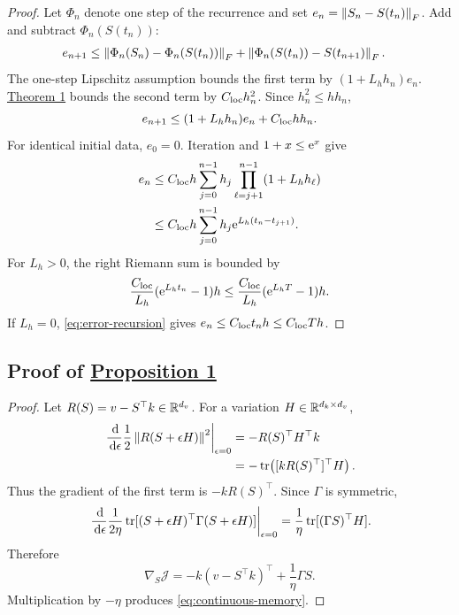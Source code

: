 \begin{proof}
Let $\Phi_n$ denote one step of the recurrence and set
$e_n=\left\lVert S_n-S(t_n)\right\rVert_F$. Add and subtract
$\Phi_n(S(t_n))$:
\begin{align}
 e_{n+1}
 &\le
 \left\lVert \Phi_n(S_n)-\Phi_n(S(t_n))\right\rVert_F
 +\left\lVert \Phi_n(S(t_n))-S(t_{n+1})\right\rVert_F.
 \label{eq:error-recursion-start}
\end{align}
The one-step Lipschitz assumption bounds the first term by
$(1+L_hh_n)e_n$.
\hyperref[thm:local-consistency]{Theorem 1} bounds the second term by
$C_{\rm loc}h_n^2$. Since $h_n^2\le hh_n$,
\begin{equation}
 e_{n+1}\le(1+L_hh_n)e_n+C_{\rm loc}hh_n.
 \label{eq:error-recursion}
\end{equation}
For identical initial data, $e_0=0$. Iteration and
$1+x\le\mathrm{e}^x$ give
\begin{align}
 e_n
 &\le C_{\rm loc}h
 \sum_{j=0}^{n-1}h_j
 \prod_{\ell=j+1}^{n-1}(1+L_hh_\ell) \notag\\
 &\le C_{\rm loc}h
 \sum_{j=0}^{n-1}h_j
 \mathrm{e}^{L_h(t_n-t_{j+1})}.
 \label{eq:discrete-gronwall-sum}
\end{align}
For $L_h>0$, the right Riemann sum is bounded by
\begin{equation}
 \frac{C_{\rm loc}}{L_h}
 (\mathrm{e}^{L_ht_n}-1)h
 \le
 \frac{C_{\rm loc}}{L_h}
 (\mathrm{e}^{L_hT}-1)h.
 \label{eq:discrete-gronwall-result}
\end{equation}
If $L_h=0$, \eqref{eq:error-recursion} gives
$e_n\le C_{\rm loc}t_nh\le C_{\rm loc}Th$.
\end{proof}

\subsection{Proof of \hyperref[prop:gradient-flow]{Proposition 1}}
\label{app:gradient-flow}

\begin{proof}
Let $R(S)=v-S^\top k\in\mathbb{R}^{d_v}$. For a variation
$H\in\mathbb{R}^{d_k\times d_v}$,
\begin{align}
 \left.\frac{\,\mathrm{d}}{\,\mathrm{d}\epsilon}
 \frac12\left\lVert R(S+\epsilon H)\right\rVert^2\right|_{\epsilon=0}
 &=-R(S)^\top H^\top k \notag\\
 &=-\operatorname{tr}\!\left([kR(S)^\top]^\top H\right).
 \label{eq:first-objective-variation}
\end{align}
Thus the gradient of the first term is $-kR(S)^\top$. Since $\Gamma$ is
symmetric,
\begin{align}
 \left.\frac{\,\mathrm{d}}{\,\mathrm{d}\epsilon}
 \frac{1}{2\eta}
 \operatorname{tr}[(S+\epsilon H)^\top\Gamma(S+\epsilon H)]
 \right|_{\epsilon=0}
 =\frac1\eta\operatorname{tr}[(\Gamma S)^\top H].
 \label{eq:regularizer-variation}
\end{align}
Therefore
\begin{equation}
 \nabla_S\mathcal J
 =-k(v-S^\top k)^\top+\frac1\eta\Gamma S.
 \label{eq:objective-gradient}
\end{equation}
Multiplication by $-\eta$ produces
\eqref{eq:continuous-memory}.
\end{proof}

